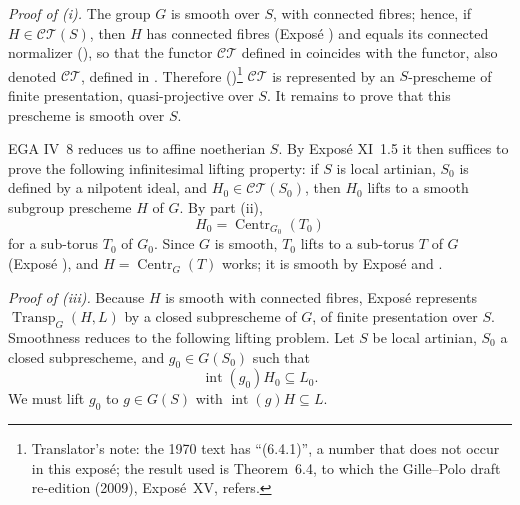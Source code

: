 \medskip\noindent\textit{Proof of (i).}
The group \(G\) is smooth over \(S\), with connected fibres; hence, if
\(H\in\mathcal{CT}(S)\), then \(H\) has connected fibres (Exposé
) and equals its connected normalizer (), so that
the functor \(\mathcal{CT}\) defined in  coincides with the functor,
also denoted \(\mathcal{CT}\), defined in . Therefore
()\footnote{Translator's note: the 1970 text has
``(6.4.1)'', a number that does not occur in this exposé; the result used is
Theorem~6.4, to which the Gille--Polo draft re-edition (2009), Exposé~XV,
refers.} \(\mathcal{CT}\) is represented by an \(S\)-prescheme of
finite presentation, quasi-projective over \(S\). It remains to prove that
this prescheme is smooth over \(S\).

EGA IV~8 reduces us to affine noetherian \(S\). By Exposé XI~1.5 it
then suffices to prove the following infinitesimal lifting property:
if \(S\) is local artinian, \(S_0\) is defined by a nilpotent ideal,
and \(H_0\in\mathcal{CT}(S_0)\), then \(H_0\) lifts to a smooth
subgroup prescheme \(H\) of \(G\). By part (ii),
\[
 H_0=\operatorname{Centr}_{G_0}(T_0)
\]
for a sub-torus \(T_0\) of \(G_0\). Since \(G\) is smooth, \(T_0\)
lifts to a sub-torus \(T\) of \(G\) (Exposé ), and
\(H=\operatorname{Centr}_G(T)\) works; it is smooth by Exposé 
and .

\medskip\noindent\textit{Proof of (iii).}
Because \(H\) is smooth with connected fibres, Exposé 
represents \(\operatorname{Transp}_G(H,L)\) by a closed subprescheme
of \(G\), of finite presentation over \(S\). Smoothness reduces to
the following lifting problem. Let \(S\) be local artinian, \(S_0\)
a closed subprescheme, and \(g_0\in G(S_0)\) such that
\[
  \operatorname{int}(g_0)H_0\subseteq L_0.
\]
We must lift \(g_0\) to \(g\in G(S)\) with
\(\operatorname{int}(g)H\subseteq L\).

